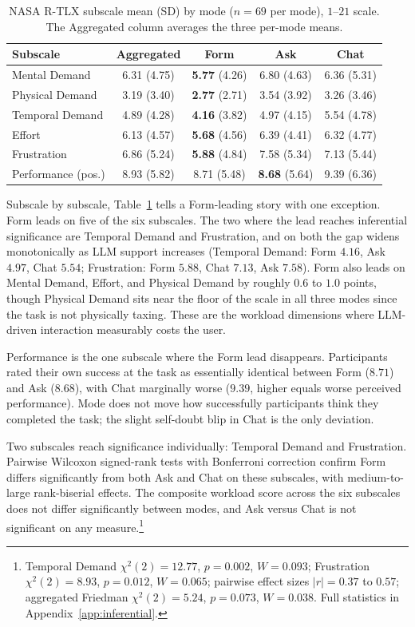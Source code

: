 \begin{table}[htbp]
\centering
\begin{tabular}{@{}l c c c c@{}}
\toprule
Subscale & Aggregated & Form & Ask & Chat \\
\midrule
Mental Demand      & 6.31 (4.75) & \textbf{5.77} (4.26) & 6.80 (4.63) & 6.36 (5.31) \\
Physical Demand    & 3.19 (3.40) & \textbf{2.77} (2.71) & 3.54 (3.92) & 3.26 (3.46) \\
Temporal Demand    & 4.89 (4.28) & \textbf{4.16} (3.82) & 4.97 (4.15) & 5.54 (4.78) \\
Effort             & 6.13 (4.57) & \textbf{5.68} (4.56) & 6.39 (4.41) & 6.32 (4.77) \\
Frustration        & 6.86 (5.24) & \textbf{5.88} (4.84) & 7.58 (5.34) & 7.13 (5.44) \\
Performance (pos.) & 8.93 (5.82) & 8.71 (5.48) & \textbf{8.68} (5.64) & 9.39 (6.36) \\
\bottomrule
\end{tabular}
\caption{NASA R-TLX subscale mean (SD) by mode ($n = 69$ per mode),
$1$--$21$ scale. The Aggregated column averages the three per-mode means.}
\label{tab:rtlx-per-subscale}
\end{table}

Subscale by subscale, Table~\ref{tab:rtlx-per-subscale} tells a
Form-leading story with one exception.
Form leads on five of the six subscales. The two where the lead
reaches inferential significance are Temporal Demand and
Frustration, and on both the gap widens monotonically as LLM
support increases (Temporal Demand: Form $4.16$, Ask $4.97$, Chat
$5.54$; Frustration: Form $5.88$, Chat $7.13$, Ask $7.58$). Form
also leads on Mental Demand, Effort, and Physical Demand by
roughly $0.6$ to $1.0$ points, though Physical Demand sits near
the floor of the scale in all three modes since the task is not
physically taxing. These are the workload dimensions where
LLM-driven interaction measurably costs the user.

Performance is the one subscale where the Form lead disappears.
Participants rated their own success at the task as essentially
identical between Form ($8.71$) and Ask ($8.68$), with Chat
marginally worse ($9.39$, higher equals worse perceived
performance). Mode does not move how successfully participants
think they completed the task; the slight self-doubt blip in Chat
is the only deviation.

Two subscales reach significance individually: Temporal
Demand and Frustration. Pairwise Wilcoxon signed-rank tests with
Bonferroni correction confirm Form differs significantly from
both Ask and Chat on these subscales, with medium-to-large
rank-biserial effects. The composite workload score across the
six subscales does not differ significantly between modes, and
Ask versus Chat is not significant on any
measure.\footnote{Temporal Demand $\chi^2(2) = 12.77$,
$p = 0.002$, $W = 0.093$; Frustration $\chi^2(2) = 8.93$,
$p = 0.012$, $W = 0.065$; pairwise effect sizes
$|r| = 0.37$ to $0.57$; aggregated Friedman
$\chi^2(2) = 5.24$, $p = 0.073$, $W = 0.038$. Full statistics in
Appendix~\ref{app:inferential}.}

